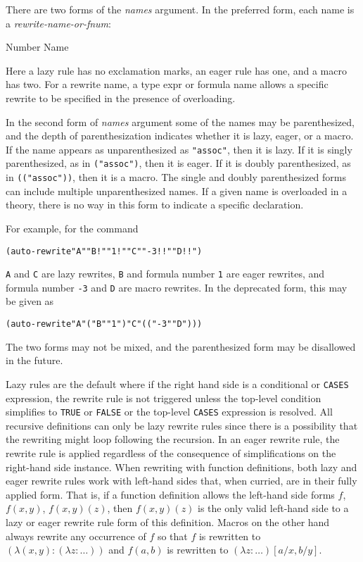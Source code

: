 \documentclass[12pt,twoside]{book}
\begin{document}
\begin{description}
There are two forms of the \emph{names} argument.  In the preferred form,
each name is a \emph{rewrite-name-or-fnum}:

\begin{bnf}
  {\opt{\lit{-}} Number \opt{\lit{!} \opt{\lit{!}}}}
  {Name \opt{\lit{!} \opt{\lit{!}}} }
\end{bnf}

Here a lazy rule has no exclamation marks, an eager rule has one, and a
macro has two.  For a rewrite name, a type expr or formula name allows a
specific rewrite to be specified in the presence of overloading.

In the second form of \emph{names} argument some of the names may be
parenthesized, and the depth of parenthesization indicates whether it is
lazy, eager, or a macro.  If the name appears as unparenthesized as
\texttt{"assoc"}, then it is lazy.  If it is singly parenthesized, as in
\texttt{("assoc")}, then it is eager.  If it is doubly parenthesized, as
in \texttt{(("assoc"))}, then it is a macro.  The single and doubly
parenthesized forms can include multiple unparenthesized names.  If a
given name is overloaded in a theory, there is no way in this form to
indicate a specific declaration.

For example, for the command
\begin{alltt}
  (auto-rewrite "A" "B!" "1!" "C" "-3!!" "D!!")
\end{alltt}
\texttt{A} and \texttt{C} are lazy rewrites, \texttt{B} and formula number
\texttt{1} are eager rewrites, and formula number \texttt{-3} and
\texttt{D} are macro rewrites.  In the deprecated form, this may be given
as
\begin{alltt}
  (auto-rewrite "A" ("B" "1") "C" (("-3" "D")))
\end{alltt}
The two forms may not be mixed, and the parenthesized form may be
disallowed in the future.

Lazy rules are the default where if the right hand side is a conditional
or \texttt{CASES} expression, the rewrite rule is not triggered unless the 
top-level condition simplifies to \texttt{TRUE} or \texttt{FALSE} or the
top-level \texttt{CASES} expression is resolved.  All recursive definitions
can only be lazy rewrite rules since there is a possibility that the
rewriting might loop following the recursion.  In an eager rewrite rule,
the rewrite rule is applied regardless of the consequence of
simplifications on the right-hand side instance.  When rewriting with
function definitions, both lazy and eager rewrite rules work with
left-hand sides that, when curried, are in their fully applied form.  That
is, if a function definition allows the left-hand side forms $f$, $f(x,
y)$, $f(x, y)(z)$, then $f(x, y)(z)$ is the only valid left-hand side to a
lazy or eager rewrite rule form of this definition.  Macros on the other
hand always rewrite any occurrence of $f$ so that $f$ is rewritten to
$(\lambda (x, y): (\lambda z: \ldots))$ and $f(a, b)$ is rewritten to
$(\lambda z: \ldots)[a/x, b/y]$\@.



\end{description}
\end{document}
